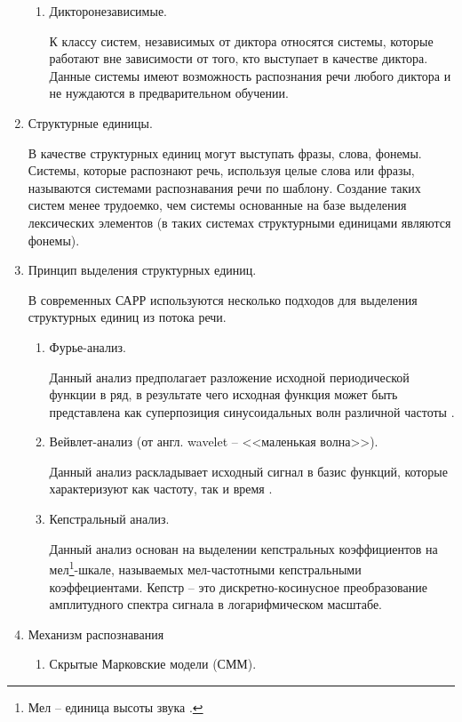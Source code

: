 \begin{enumerate}
\begin{enumerate}
		\item Дикторонезависимые.
		
		К классу систем, независимых от диктора относятся системы, которые 	работают вне зависимости от того, кто выступает в качестве диктора. Данные системы имеют возможность распознания речи любого диктора и не нуждаются в предварительном обучении.
		
	\end{enumerate}
	\item Структурные единицы. 
	
	В качестве структурных единиц могут выступать фразы, слова, фонемы. Системы, которые распознают речь, используя целые слова или фразы, называются системами распознавания речи по шаблону. Создание таких систем менее трудоемко, чем системы основанные на базе выделения лексических элементов (в таких системах структурными единицами являются фонемы). 
	
	\item Принцип выделения структурных единиц.
	
	В современных САРР используются несколько подходов для выделения структурных единиц из потока речи. 
	\begin{enumerate}
		\item Фурье-анализ. 
		
		Данный анализ предполагает разложение исходной периодической функции в ряд, в результате чего исходная функция может быть представлена как суперпозиция синусоидальных волн различной частоты \cite{fur_veivlet}.
		\item Вейвлет-анализ (от англ. wavelet -- <<маленькая волна>>). 
		
		Данный анализ раскладывает исходный сигнал в базис функций, которые характеризуют как частоту, так и время \cite{fur_veivlet}.
		\item Кепстральный анализ. 
		
		Данный анализ основан на выделении кепстральных коэффициентов на мел\footnote{Мел -- единица высоты звука \cite{kepstr}.}-шкале, называемых мел-частотными кепстральными коэффециентами. Кепстр -- это дискретно-косинусное преобразование амплитудного спектра сигнала в логарифмическом масштабе. 
	\end{enumerate}
	
	\item Механизм распознавания
	\begin{enumerate}
		\item Скрытые Марковские модели (СММ).
		

\end{enumerate}
\end{enumerate}
